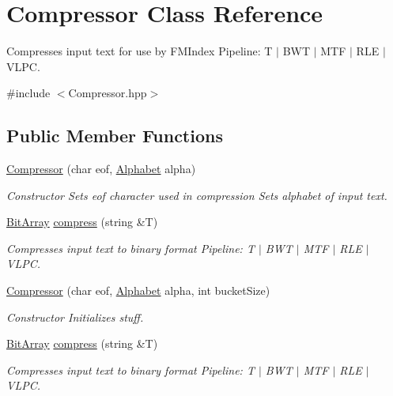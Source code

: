\hypertarget{class_compressor}{\section{\-Compressor \-Class \-Reference}
\label{class_compressor}
}


\-Compresses input text for use by \-F\-M\-Index \-Pipeline\-: \-T $|$ \-B\-W\-T $|$ \-M\-T\-F $|$ \-R\-L\-E $|$ \-V\-L\-P\-C.  




{\ttfamily \#include $<$\-Compressor.\-hpp$>$}

\subsection*{\-Public \-Member \-Functions}
\begin{DoxyCompactItemize}
\item 
\hyperlink{class_compressor_a5bb2db003d123bb6214b329f6603da00}{\-Compressor} (char eof, \hyperlink{class_alphabet}{\-Alphabet} alpha)
\begin{DoxyCompactList}\small\item\em \-Constructor \-Sets eof character used in compression \-Sets alphabet of input text. \end{DoxyCompactList}\item 
\hyperlink{class_bit_array}{\-Bit\-Array} \hyperlink{class_compressor_a5ffe1a80b2ad17f7709c62c0f00b5bd9}{compress} (string \&\-T)
\begin{DoxyCompactList}\small\item\em \-Compresses input text to binary format \-Pipeline\-: \-T $|$ \-B\-W\-T $|$ \-M\-T\-F $|$ \-R\-L\-E $|$ \-V\-L\-P\-C. \end{DoxyCompactList}\item 
\hyperlink{class_compressor_a09683910e8b5facb19d79ee4d1d79e19}{\-Compressor} (char eof, \hyperlink{class_alphabet}{\-Alphabet} alpha, int bucket\-Size)
\begin{DoxyCompactList}\small\item\em \-Constructor \-Initializes stuff. \end{DoxyCompactList}\item 
\hyperlink{class_bit_array}{\-Bit\-Array} \hyperlink{class_compressor_a5ffe1a80b2ad17f7709c62c0f00b5bd9}{compress} (string \&\-T)
\begin{DoxyCompactList}\small\item\em \-Compresses input text to binary format \-Pipeline\-: \-T $|$ \-B\-W\-T $|$ \-M\-T\-F $|$ \-R\-L\-E $|$ \-V\-L\-P\-C. \end{DoxyCompactList}\item 

\end{DoxyCompactItemize}
